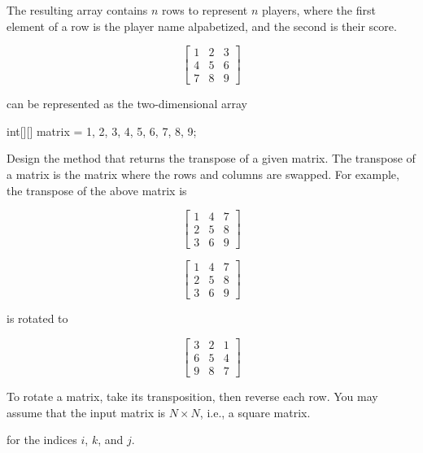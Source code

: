 The resulting array contains $n$ rows to represent $n$ players, where the first element of a row is the player name alpabetized, and the second is their score.



\[
\begin{bmatrix}
    1 & 2 & 3\\
    4 & 5 & 6\\
    7 & 8 & 9
\end{bmatrix}
\]

\noindent can be represented as the two-dimensional array

\begin{verbnobox}[\small]
int[][] matrix = {{1, 2, 3}, {4, 5, 6}, {7, 8, 9}};
\end{verbnobox}

\noindent Design the  method that returns the transpose of a given matrix. The transpose of a matrix is the matrix where the rows and columns are swapped. For example, the transpose of the above matrix is

\[
\begin{bmatrix}
    1 & 4 & 7\\
    2 & 5 & 8\\
    3 & 6 & 9
\end{bmatrix}
\]


\[
\begin{bmatrix}
    1 & 4 & 7\\
    2 & 5 & 8\\
    3 & 6 & 9
\end{bmatrix}
\]

\noindent is rotated to

\[
\begin{bmatrix}
    3 & 2 & 1\\
    6 & 5 & 4\\
    9 & 8 & 7
\end{bmatrix}
\]

To rotate a matrix, take its transposition, then reverse each row. You may assume that the input matrix is $N \times N$, i.e., a square matrix.

 for the indices $i$, $k$, and $j$.

